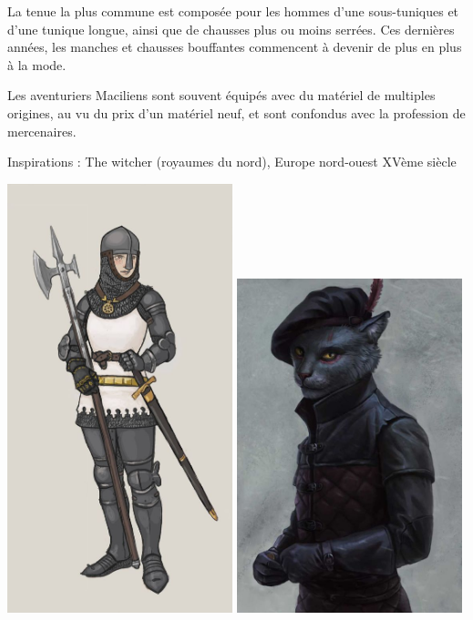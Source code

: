 \documentclass[10pt,a4paper]{book}
\begin{document}
La tenue la plus commune est composée pour les hommes d'une sous-tuniques et d'une tunique longue, ainsi que de chausses plus ou moins serrées. Ces dernières années, les manches et chausses bouffantes commencent à devenir de plus en plus à la mode.

Les aventuriers Maciliens sont souvent équipés avec du matériel de multiples origines, au vu du prix d'un matériel neuf, et sont confondus avec la profession de mercenaires.

Inspirations : The witcher (royaumes du nord), Europe nord-ouest XVème siècle

\includegraphics[width=0.49\textwidth]{humaine 1}
\includegraphics[width=0.49\textwidth]{khajit 1}
\end{document}

